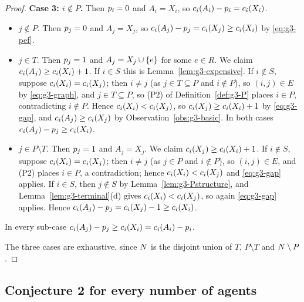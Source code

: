 \begin{proof}
\smallskip
\noindent\textbf{Case 3: $i \notin P$.}
Then $p_i = 0$ and $A_i = X_i$, so
$c_i(A_i) - p_i = c_i(X_i)$.
\begin{itemize}
  \item[(3a)] $j \notin P$. Then $p_j = 0$ and $A_j = X_j$, so
    $c_i(A_j) - p_j = c_i(X_j) \ge c_i(X_i)$ by
    \eqref{eq:g3-pef}.
  \item[(3b)] $j \in T$. Then $p_j = 1$ and $A_j = X_j \cup \left\{e\right\}$
    for some $e \in R$. We claim $c_i(A_j) \ge c_i(X_i) + 1$.
    If $i \in S$ this is Lemma~\ref{lem:g3-expensive}. If $i \notin S$,
    suppose $c_i(X_i) = c_i(X_j)$; then $i \ne j$ (as $j \in T
    \subseteq P$ and $i \notin P$), so $(i,j) \in E$ by
    \eqref{eq:g3-graph}, and $j \in T \subseteq P$, so (P2) of
    Definition~\ref{def:g3-P} places $i \in P$, contradicting $i \notin P$.
    Hence $c_i(X_i) < c_i(X_j)$, so $c_i(X_j) \ge c_i(X_i)+1$
    by \eqref{eq:g3-gap}, and $c_i(A_j) \ge c_i(X_j)$ by
    Observation~\ref{obs:g3-basic}. In both cases
    $c_i(A_j) - p_j \ge c_i(X_i)$.
  \item[(3c)] $j \in P \setminus T$. Then $p_j = 1$ and $A_j = X_j$.
    We claim $c_i(X_j) \ge c_i(X_i) + 1$. If $i \notin S$, suppose
    $c_i(X_i) = c_i(X_j)$; then $i \ne j$ (as $j \in P$ and
    $i \notin P$), so $(i,j) \in E$, and (P2) places $i \in P$, a
    contradiction; hence $c_i(X_i) < c_i(X_j)$ and \eqref{eq:g3-gap}
    applies. If $i \in S$, then $j \notin S$ by
    Lemma~\ref{lem:g3-Pstructure}, and Lemma~\ref{lem:g3-terminal}(d) gives
    $c_i(X_i) < c_i(X_j)$, so again \eqref{eq:g3-gap} applies. Hence
    $c_i(A_j) - p_j = c_i(X_j) - 1 \ge c_i(X_i)$.
\end{itemize}
In every sub-case $c_i(A_j) - p_j \ge c_i(X_i) =
c_i(A_i) - p_i$.

\smallskip
The three cases are exhaustive, since $N$ is the disjoint union of $T$,
$P \setminus T$ and $N \setminus P$.
\end{proof}

\subsection{Conjecture 2 for every number of agents}
\label{sec:g3-main}

